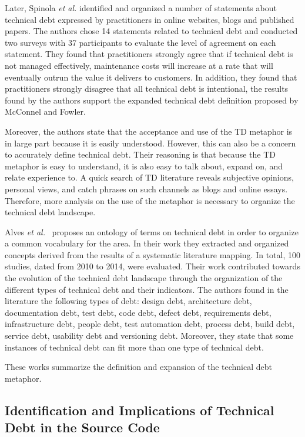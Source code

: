 Later, Spinola \textit{et al.} \cite{Spinola2013MTD} identified and organized a number of statements about technical debt expressed by practitioners in online websites, blogs and published papers. The authors chose 14 statements related to technical debt and conducted two surveys with 37 participants to evaluate the level of agreement on each statement. 
They found that practitioners strongly agree that if technical debt is not managed effectively, maintenance costs will increase at a rate that will eventually outrun the value it delivers to customers. In addition, they found that practitioners strongly disagree that all technical debt is intentional, the results found by the authors support the expanded technical debt definition proposed by McConnel and Fowler. 

Moreover, the authors state that the acceptance and use of the TD metaphor is in large part because it is easily understood. However, this can also be a concern to accurately define technical debt. Their reasoning is that because the TD metaphor is easy to understand, it is also easy to talk about, expand on, and relate experience to. A quick search of TD literature reveals subjective opinions, personal views, and catch phrases on such channels as blogs and online essays. Therefore, more analysis on the use of the metaphor is necessary to organize the technical debt landscape.

Alves \textit{et al.}~\cite{Alves2014MTD,Alves2016IST} proposes an ontology of terms on technical debt in order to organize a common vocabulary for the area. In their work they extracted and organized concepts derived from the results of a systematic literature mapping. In total, 100 studies, dated from 2010 to 2014, were evaluated. Their work contributed towards the evolution of the technical debt landscape through the organization of the different types of technical debt and their indicators. The authors found in the literature the following types of debt: design debt, architecture debt, documentation debt, test debt, code debt, defect debt, requirements debt, infrastructure debt, people debt, test automation debt, process debt, build debt, service debt, usability debt and versioning debt. Moreover, they state that some instances of technical debt can fit more than one type of technical debt. 

These works summarize the definition and expansion of the technical debt metaphor. 

\subsection{Identification and Implications of Technical Debt in the Source Code}

